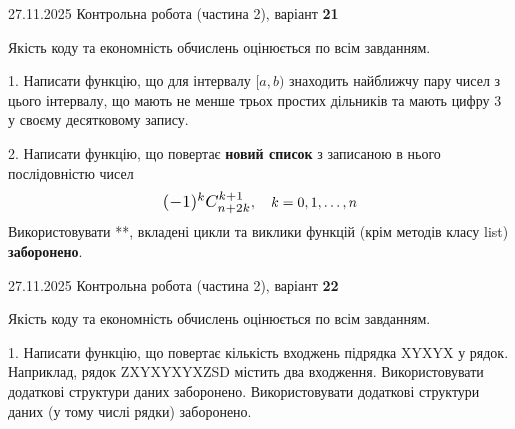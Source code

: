 \documentclass[11pt, ukrainian]{article}
\begin{document}
{{{{{{{{{{{{{{{{{{{{\begin {large}
\end{large}
\newpage
{{27.11.2025 Контрольна робота  (частина 2), варіант  \No \textbf { 21 }\par}}


{
\begin {large}
Якість коду та економність обчислень оцінюється по всім завданням.


1. Написати функцію, що для інтервалу $[a, b)$ знаходить найближчу пару чисел з цього інтервалу, що мають не менше трьох простих дільників та мають цифру 3 у своєму десятковому запису.


2. 
Написати функцію, що повертає \textbf{новий список} з записаною в нього послідовністю чисел
$$\scalebox{1.2}{$(-1)^{k}C_{n+2k}^{k+1}$}, \quad k=0,1,\ldots,n$$
Використовувати **, вкладені цикли та виклики функцій (крім методів класу list) \textbf{заборонено}.

\end{large}
\newpage
{{27.11.2025 Контрольна робота  (частина 2), варіант  \No \textbf { 22 }\par}}


{
\begin {large}
Якість коду та економність обчислень оцінюється по всім завданням.


1. Написати функцію, що повертає кількість входжень підрядка XYXYX у рядок. Наприклад, рядок ZXYXYXYXZSD містить два входження. Використовувати додаткові структури даних заборонено. Використовувати додаткові структури даних (у тому числі рядки) заборонено.



\end{large}}}}}}}}}}}}}}}}}}}}}}}
\end{document}

